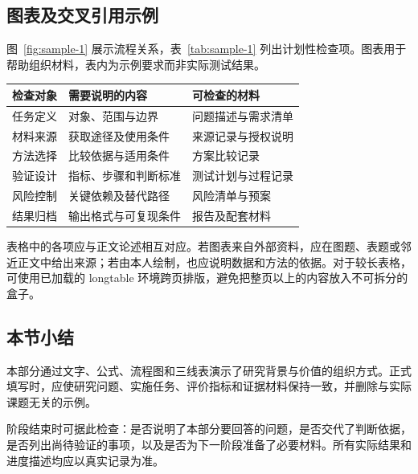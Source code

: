 \subsection{图表及交叉引用示例}
图~\ref{fig:sample-1} 展示流程关系，表~\ref{tab:sample-1} 列出计划性检查项。图表用于帮助组织材料，表内为示例要求而非实际测试结果。
\begin{center}
\begin{minipage}{\linewidth}\centering
{}
\label{fig:sample-1}
\end{minipage}\end{center}
\begin{center}\begin{minipage}{\linewidth}\centering
{}\label{tab:sample-1}
\begin{tabularx}{\linewidth}{p{23mm}XX}
\toprule
检查对象 & 需要说明的内容 & 可检查的材料\\
\midrule
任务定义 & 对象、范围与边界 & 问题描述与需求清单\\
材料来源 & 获取途径及使用条件 & 来源记录与授权说明\\
方法选择 & 比较依据与适用条件 & 方案比较记录\\
验证设计 & 指标、步骤和判断标准 & 测试计划与过程记录\\
风险控制 & 关键依赖及替代路径 & 风险清单与预案\\
结果归档 & 输出格式与可复现条件 & 报告及配套材料\\
\bottomrule
\end{tabularx}
\end{minipage}\end{center}
表格中的各项应与正文论述相互对应。若图表来自外部资料，应在图题、表题或邻近正文中给出来源；若由本人绘制，也应说明数据和方法的依据。对于较长表格，可使用已加载的 longtable 环境跨页排版，避免把整页以上的内容放入不可拆分的盒子。

\subsection{本节小结}
本部分通过文字、公式、流程图和三线表演示了研究背景与价值的组织方式。正式填写时，应使研究问题、实施任务、评价指标和证据材料保持一致，并删除与实际课题无关的示例。

阶段结束时可据此检查：是否说明了本部分要回答的问题，是否交代了判断依据，是否列出尚待验证的事项，以及是否为下一阶段准备了必要材料。所有实际结果和进度描述均应以真实记录为准。
